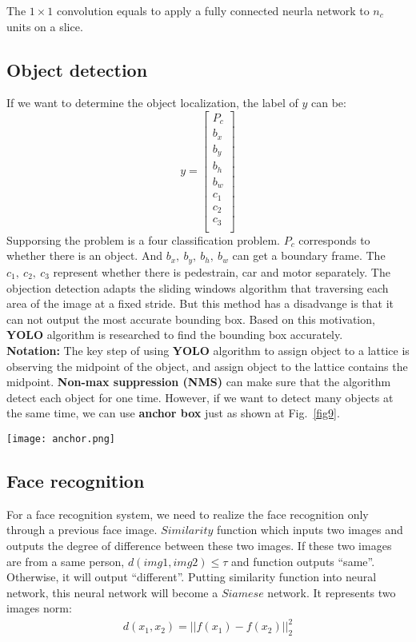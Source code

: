 \documentclass[a4paper]{article}
\begin{document}
The $1\times 1$ convolution equals to apply a fully connected neurla network to $n_c$ units on a slice.

\subsection{Object detection}

If we want to determine the object localization, the label of $y$ can be:\\
$$y = \begin{bmatrix}
P_c\\ 
b_x\\
b_y\\
b_h \\
b_w \\
c_1\\
c_2\\
c_3\\
\end{bmatrix}$$
Supporsing the problem is a four classification problem. $P_c$ corresponds to whether there is an object. And $b_x,~b_y,~b_h,~b_w$ can get a boundary frame. The $c_1,~c_2,~c_3$ represent whether there is pedestrain, car and motor separately. The objection detection adapts the sliding windows algorithm that traversing each area of the image at a fixed stride. But this method has a disadvange is that it can not output the most accurate bounding box. Based on this motivation, {\bf YOLO} algorithm is researched to find the bounding box accurately. \\
{\bf Notation:} The key step of using {\bf YOLO} algorithm to assign object to a lattice is observing the midpoint of the object, and assign object to the lattice contains the midpoint. {\bf Non-max suppression (NMS)} can make sure that the algorithm detect each object for one time. However, if we want to detect many objects at the same time, we can use {\bf anchor box} just as shown at Fig.~\ref{fig9}.

\begin{figure*}
\begin{center}
\texttt{[image: anchor.png]}
\end{center}
\caption{Overlapping objects.}
\label{fig9}
\end{figure*}

\subsection{Face recognition}

For a face recognition system, we need to realize the face recognition only through a previous face image. $Similarity$ function which inputs two images and outputs the degree of difference between these two images. If these two images are from a same person, $d(img1, img2) \le \tau$ and function outputs ``same''. Otherwise, it will output ``different''. Putting similarity function into neural network, this neural network will become a $Siamese$ network. It represents two images norm:\\
\begin{gather}
d(x_1, x_2) =  ||f(x_1) - f(x_2)||_2^2
\end{gather}
\end{document}
